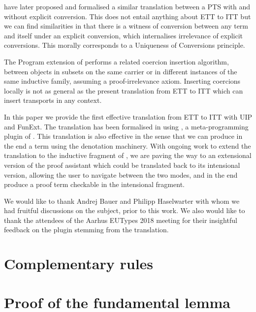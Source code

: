 \cite{van2013explicit} have later proposed and
formalised a similar translation between a PTS with and without explicit
conversion. This does not entail anything about ETT to ITT but we can
find similarities in that there is a witness of conversion between any
term and itself under an explicit conversion, which internalises
irrelevance of explicit conversions. This morally corresponds to a
Uniqueness of Conversions principle.

The Program \cite{sozeau:icfp07} extension of \Coq performs a
related coercion insertion algorithm, between objects in subsets on the
same carrier or in different instances of the same inductive family,
assuming a proof-irrelevance axiom. Inserting coercions locally is not
as general as the present translation from ETT to ITT which can insert
transports in any context.

In this paper we provide the first effective translation from ETT to ITT
with UIP and FunExt. The translation has been
formalised in \Coq using \TemplateCoq, a meta-programming plugin of
\Coq. This translation is also effective in the sense that we can
produce in the end a \Coq term using the \TemplateCoq denotation
machinery.
%
With ongoing work to extend the translation to the inductive fragment
of \Coq, we are paving the way to an extensional version of the \Coq
proof assistant which could be translated back to its intensional
version, allowing the user to navigate between the two modes, and in
the end produce a proof term checkable in the intensional fragment.

  We would like to thank Andrej Bauer and Philipp Haselwarter with whom we had
  fruitful discussions on the subject, prior to this work.
  We also would like to thank the attendees of the Aarhus EUTypes 2018 meeting
  for their insightful feedback on the plugin stemming from the translation.


\newpage
\onecolumn
\appendix

\section{Complementary rules}
\label{sec:more-rules}




\section{Proof of the fundamental lemma}
\label{sec:proof-fund-lemma}

